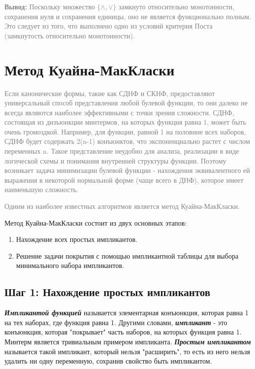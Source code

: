\documentclass[12pt,letterpaper]{article}
\begin{document}
\textcolor{gray}{\textbf{Вывод:} Поскольку множество \(\{\wedge, \vee\}\) замкнуто относительно монотонности, сохранения нуля и сохранения единицы, оно не является функционально полным. Это следует из того, что выполнено одно из условий критерия Поста (замкнутость относительно монотонности).}

\section{Метод Куайна-МакКласки}

\textcolor{gray}{Если канонические формы, такие как СДНФ и СКНФ, предоставляют универсальный способ представления любой булевой функции, то они далеко не всегда являются наиболее эффективными с точки зрения сложности. СДНФ, состоящая из дизъюнкции минтермов, на которых функция равна 1, может быть очень громоздкой. Например, для функции, равной 1 на половине всех наборов, СДНФ будет содержать 2(n-1) конъюнктов, что экспоненциально растет с числом переменных n. Такое представление неудобно для анализа, реализации в виде логической схемы и понимания внутренней структуры функции. Поэтому возникает задача минимизации булевой функции - нахождения эквивалентного ей выражения в некоторой нормальной форме (чаще всего в ДНФ), которое имеет наименьшую сложность.}

\textcolor{gray}{Одним из наиболее известных алгоритмов является метод Куайна-МакКласки.}

Метод Куайна-МакКласки состоит из двух основных этапов:

\begin{enumerate}
  \item Нахождение всех простых импликантов.
  \item Решение задачи покрытия с помощью импликантной таблицы для выбора минимального набора импликантов.
\end{enumerate}

\subsection{Шаг 1: Нахождение простых импликантов}

\textbf{\emph{Импликантой функцией}} называется элементарная конъюнкция, которая равна 1 на тех наборах, где функция равна 1. Другими словами, \textbf{\emph{импликант}} - это конъюнкция, которая "покрывает" часть наборов, на которых функция равна 1. Минтерм является тривиальным примером импликанта. \textbf{\emph{Простым импликантом}} называется такой импликант, который нельзя "расширить", то есть из него нельзя удалить ни одну переменную, сохранив свойство быть импликантом.
\end{document}
